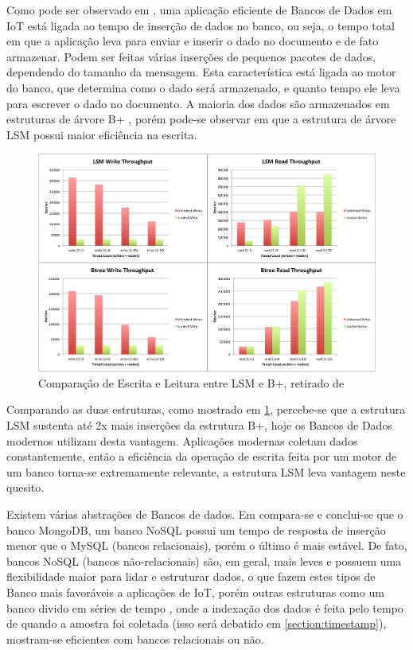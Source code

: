 Como pode ser observado em \cite{Damodaran}, uma aplicação eficiente de Bancos de Dados em IoT está ligada ao tempo de inserção de dados no banco, ou seja,  o tempo total em que a aplicação leva para enviar e inserir o dado no documento e de fato armazenar. Podem ser feitas várias inserções de pequenos pacotes de dados, dependendo do tamanho da mensagem. Esta característica está ligada ao motor do banco, que determina como o dado será armazenado, e quanto tempo ele leva para escrever o dado no documento. A maioria dos dados são armazenados em estruturas de árvore B+ \cite{b-tree}, porém pode-se observar em \cite{Damodaran} que a estrutura de árvore LSM  \cite{O'Neal-Gawlick-Cheng} possui maior eficiência na escrita.


\begin{figure}[h!]
\centering
\includegraphics[width=14cm]{./02_Capitulos/02_Cap3/figures/LSM_btree}
\caption{Comparação de Escrita e Leitura entre LSM e B+, retirado de \cite{btrees-vs-lsmtrees}}
\label{fig:3.3.5/b-lsm}
\end{figure}

Comparando as duas estruturas, como mostrado em \ref{fig:3.3.5/b-lsm}, percebe-se que a estrutura LSM sustenta até 2x mais inserções da estrutura B+, hoje os Bancos de Dados modernos utilizam desta vantagem. Aplicações modernas coletam dados constantemente, então a eficiência da operação de escrita feita por um motor de um banco torna-se extremamente relevante, a estrutura LSM leva vantagem neste quesito.

Existem várias abstrações de Bancos de dados. Em \cite{Rautmare-Bhalerao} compara-se e conclui-se que o banco MongoDB, um banco NoSQL possui um tempo de resposta de inserção menor que o MySQL (bancos relacionais), porém o último é mais estável. De fato, bancos NoSQL (bancos não-relacionais) são, em geral, mais leves e possuem uma flexibilidade maior para lidar e estruturar dados, o que fazem estes tipos de Banco mais favoráveis a aplicações de IoT, porém outras estruturas como um banco divido em séries de tempo \cite{timeseries} , onde a indexação dos dados é feita pelo tempo de quando a amostra foi coletada (isso será debatido em \ref{section:timestamp}), mostram-se eficientes com bancos relacionais ou não.


